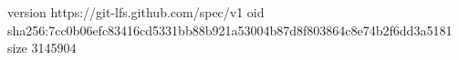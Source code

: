 version https://git-lfs.github.com/spec/v1
oid sha256:7cc0b06efc83416cd5331bb88b921a53004b87d8f803864c8e74b2f6dd3a5181
size 3145904
